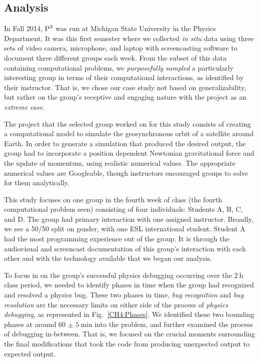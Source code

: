 \documentclass{msuphddissertation}
\begin{document}
\begin{doublespace}
\subsection{Analysis}

In Fall 2014, ${\rm P}^{3}$ was run at Michigan State University in the Physics Department.  It was this first semester where we collected \emph{in situ} data using three sets of video camera, microphone, and laptop with screencasting software to document three different groups each week.  From the subset of this data containing computational problems, we \emph{purposefully sampled} a particularly interesting group in terms of their computational interactions, as identified by their instructor.  That is, we chose our case study not based on generalizability, but rather on the group's receptive and engaging nature with the project as an \emph{extreme case}.\cite{Flyvbjerg2006}

The project that the selected group worked on for this study consists of creating a computational model to simulate the geosynchronous orbit of a satellite around Earth.  In order to generate a simulation that produced the desired output, the group had to incorporate a position dependent Newtonian gravitational force and the update of momentum, using realistic numerical values.  The appropriate numerical values are Googleable, though instructors encouraged groups to solve for them analytically.

This study focuses on one group in the fourth week of class (the fourth computational problem seen) consisting of four individuals: Students A, B, C, and D.  The group had primary interaction with one assigned instructor.  Broadly, we see a 50/50 split on gender, with one ESL international student.  Student A had the most programming experience out of the group.  It is through the audiovisual and screencast documentation of this group's interaction with each other and with the technology available that we began our analysis.

To focus in on the group's successful physics debugging occurring over the $\SI{2}{\hour}$ class period, we needed to identify phases in time when the group had recognized and resolved a physics bug.  These two phases in time, \emph{bug recognition} and \emph{bug resolution} are the necessary limits on either side of the process of \emph{physics debugging}, as represented in Fig.~\ref{CH4:Phases}.  We identified these two bounding phases at around $\SI{60(5)}{\minute}$ into the problem, and further examined the process of debugging in-between.  That is, we focused on the crucial moments surrounding the final modifications that took the code from producing unexpected output to expected output.


\end{doublespace}
\end{document}
